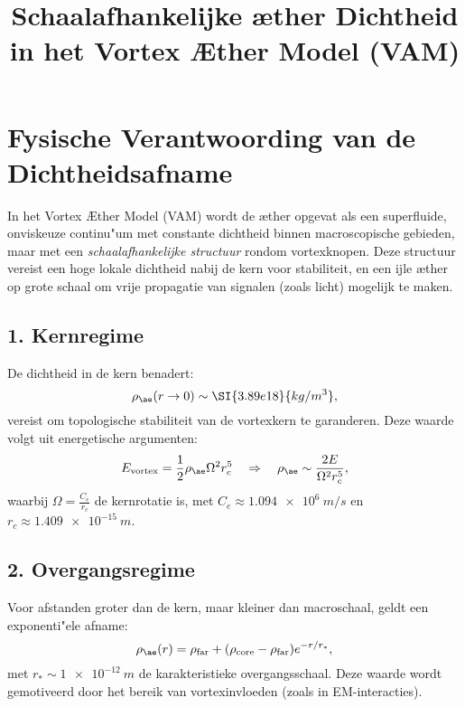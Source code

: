 \documentclass[a4paper,12pt]{article}
\title{Schaalafhankelijke \ae ther Dichtheid in het Vortex \AE ther Model (VAM)}
\author{}
\date{}
\begin{document}
\maketitle

\section*{Fysische Verantwoording van de Dichtheidsafname}

In het Vortex \AE ther Model (VAM) wordt de \ae ther opgevat als een superfluide, onviskeuze continu"um met constante dichtheid binnen macroscopische gebieden, maar met een \emph{schaalafhankelijke structuur} rondom vortexknopen. Deze structuur vereist een hoge lokale dichtheid nabij de kern voor stabiliteit, en een ijle \ae ther op grote schaal om vrije propagatie van signalen (zoals licht) mogelijk te maken.

\subsection*{1. Kernregime}

De dichtheid in de kern benadert:
\begin{equation}
\rho_{\ae}(r \to 0) \sim \SI{3.89e18}{kg/m^3},
\end{equation}
vereist om topologische stabiliteit van de vortexkern te garanderen. Deze waarde volgt uit energetische argumenten:
\begin{equation}
E_{\text{vortex}} = \frac{1}{2} \rho_{\ae} \Omega^2 r_c^5 \quad\Rightarrow\quad \rho_{\ae} \sim \frac{2 E}{\Omega^2 r_c^5},
\end{equation}
waarbij \( \Omega = \frac{C_e}{r_c} \) de kernrotatie is, met \( C_e \approx \SI{1.094e6}{m/s} \) en \( r_c \approx \SI{1.409e-15}{m} \).

\subsection*{2. Overgangsregime}

Voor afstanden groter dan de kern, maar kleiner dan macroschaal, geldt een exponenti"ele afname:
\begin{equation}
\rho_{\ae}(r) = \rho_{\text{far}} + (\rho_{\text{core}} - \rho_{\text{far}}) e^{-r/r_*},
\end{equation}
met \( r_* \sim \SI{1e-12}{m} \) de karakteristieke overgangsschaal. Deze waarde wordt gemotiveerd door het bereik van vortexinvloeden (zoals in EM-interacties).
\end{document}
